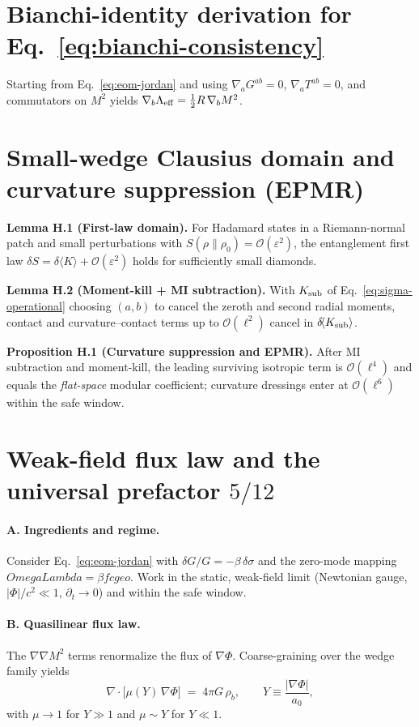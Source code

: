 \documentclass[aps,prd,onecolumn,superscriptaddress,nofootinbib]{revtex4-2}
\def\OmL{OmegaLambda}%
\def\cgeo{cgeo}%
\newcommand{\OmL}{\Omega_\Lambda}
\newcommand{\cgeo}{c_{\rm geo}}
\begin{document}
\section{Bianchi-identity derivation for Eq.~\eqref{eq:bianchi-consistency}}
\label{app:bianchi-derivation}
Starting from Eq.~\eqref{eq:eom-jordan} and using \(\nabla_a G^{ab}=0\), \(\nabla_a T^{ab}=0\), and commutators on \(M^2\) yields \(\nabla_b \Lambda_{\rm eff} = \tfrac12 R\,\nabla_b M^2\).

\section{Small-wedge Clausius domain and curvature suppression (EPMR)}
\label{app:epmr}
\noindent\textbf{Lemma H.1 (First-law domain).}
For Hadamard states in a Riemann-normal patch and small perturbations with $S(\rho\|\rho_0)=\mathcal O(\varepsilon^2)$, the entanglement first law
$\delta S=\delta\!\langle K\rangle+\mathcal O(\varepsilon^2)$
holds for sufficiently small diamonds.

\medskip
\noindent\textbf{Lemma H.2 (Moment-kill + MI subtraction).}
With $K_{\rm sub}$ of Eq.~\eqref{eq:sigma-operational} choosing $(a,b)$ to cancel the zeroth and second radial moments, contact and curvature--contact terms up to $\mathcal O(\ell^2)$ cancel in $\delta\!\langle K_{\rm sub}\rangle$.

\medskip
\noindent\textbf{Proposition H.1 (Curvature suppression and EPMR).}
After MI subtraction and moment-kill, the leading surviving isotropic term is $\mathcal O(\ell^4)$ and equals the \emph{flat-space} modular coefficient; curvature dressings enter at $\mathcal O(\ell^6)$ within the safe window.

\section{Weak-field flux law and the universal prefactor \texorpdfstring{$5/12$}{5/12}}
\label{app:a0-derivation}
\paragraph*{A. Ingredients and regime.}
Consider Eq.~\eqref{eq:eom-jordan} with \(\delta G/G=-\beta\,\delta\sigma\) and the zero-mode mapping \(\OmL=\beta f \cgeo\).
Work in the static, weak-field limit (Newtonian gauge, $|\Phi|/c^2\ll1$, $\partial_t\!\to\!0$) and within the safe window.

\paragraph*{B. Quasilinear flux law.}
The \(\nabla\nabla M^2\) terms renormalize the flux of \(\nabla\Phi\). Coarse-graining over the wedge family yields
\begin{equation}
\nabla\!\cdot\!\big[\mu(Y)\,\nabla\Phi\big] \;=\; 4\pi G\,\rho_b, \qquad
Y \equiv \frac{|\nabla\Phi|}{a_0},
\end{equation}
with \(\mu\!\to\!1\) for \(Y\!\gg\!1\) and \(\mu\!\sim\!Y\) for \(Y\!\ll\!1\).
\end{document}

